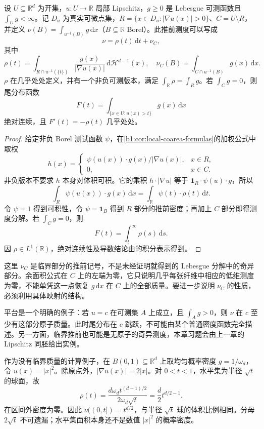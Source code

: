 \begin{proposition}\label{b1:prop:distribution-coarea-decomposition}
设 \(U\subseteq\mathbb R^d\) 为开集，\(u:U\to\mathbb R\) 局部 Lipschitz，\(g\ge0\) 是 Lebesgue 可测函数且 \(\int_Ug<\infty\)。记 \(D_u\) 为真实可微点集，\(R=\{x\in D_u:|\nabla u(x)|>0\}\)、\(C=U\setminus R\)，并定义 \(\nu(B)=\int_{u^{-1}(B)}g\,\mathrm dx\)（\(B\subseteq\mathbb R\) Borel）。此推前测度可以写成
\[
 \nu=\rho(t)\,\mathrm dt+\nu_C,
\]
其中
\[
 \rho(t)=\int_{R\cap u^{-1}(\{t\})}
          \frac{g(x)}{|\nabla u(x)|}\,
          \mathrm d\mathcal H^{d-1}(x),
 \quad
 \nu_C(B)=\int_{C\cap u^{-1}(B)}g(x)\,\mathrm dx.
\]
\(\rho\) 在几乎处处定义，并有一个非负可测版本，满足
\(\int_{\mathbb R}\rho=\int_Rg\)。若 \(\int_Cg=0\)，则尾分布函数
\[
 F(t)=\int_{\{x\in U:u(x)>t\}}g(x)\,\mathrm dx
\]
绝对连续，且 \(F'(t)=-\rho(t)\) 几乎处处。
\end{proposition}
\begin{proof}
给定非负 Borel 测试函数 \(\psi\)，在\cref{b1:cor:local-coarea-formulas}的加权公式中取权
\[
 h(x)=
 \begin{cases}
  \psi(u(x))\cdot g(x)/|\nabla u(x)|,&x\in R,\\
  0,&x\in C.
 \end{cases}
\]
非负版本不要求 \(h\) 本身对体积可积。它的乘积 \(h\cdot|\nabla u|\) 等于 \(\mathbf1_R\cdot\psi(u)\cdot g\)，所以
\[
 \int_R\psi(u(x))\cdot g(x)\,\mathrm dx
 =\int_{\mathbb R}\psi(t)\cdot\rho(t)\,\mathrm dt.
\]
令 \(\psi=1\) 得到可积性，令 \(\psi=\mathbf1_B\) 得到 \(R\) 部分的推前密度；再加上 \(C\) 部分即得测度分解。若 \(\int_Cg=0\)，则
\[
 F(t)=\int_t^\infty\rho(s)\,\mathrm ds.
\]
因 \(\rho\in L^1(\mathbb R)\)，绝对连续性及导数结论由的积分表示得到。
\end{proof}

这里 \(\nu_C\) 是临界部分的推前记号，不是未经证明就得到的 Lebesgue 分解中的奇异部分。余面积公式在 \(C\) 上的左端为零，它只说明几乎每张纤维中相应的低维测度为零，不能单凭这一点恢复 \(g\,\mathrm dx\) 在 \(C\) 上的全部质量。要进一步说明 \(\nu_C\) 的性质，必须利用具体映射的结构。

\ProseParagraphBreak

平台是一个明确的例子：若 \(u=c\) 在可测集 \(A\) 上成立，且 \(\int_Ag>0\)，则 \(\nu\) 在 \(c\) 至少有这部分原子质量。此时尾分布在 \(c\) 跳跃，不可能由某个普通密度函数完全描述。另一方面，临界推前也可能是无原子的奇异测度，本章习题会由上一章的 Lipschitz 同胚给出实例。

\ProseParagraphBreak

作为没有临界质量的计算例子，在 \(B(0,1)\subseteq\mathbb R^d\) 上取均匀概率密度 \(g=1/\omega_d\)，令 \(u(x)=|x|^2\)。除原点外，\(|\nabla u(x)|=2|x|\)。对 \(0<t<1\)，水平集为半径 \(\sqrt t\) 的球面，故
\[
 \rho(t)=\frac{d\omega_d t^{(d-1)/2}}{2\omega_d\sqrt t}
         =\frac d2t^{d/2-1}.
\]
在区间外密度为零。因此 \(\nu((0,t])=t^{d/2}\)，与半径 \(\sqrt t\) 球的体积比例相同。分母 \(2\sqrt t\) 不可遗漏；水平集面积本身还不是数值 \(|x|^2\) 的概率密度。

